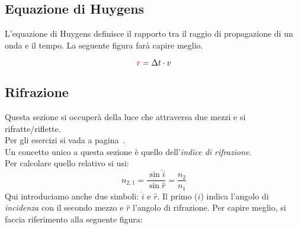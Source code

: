 \subsection{Equazione di Huygens}
L'equazione di Huygens definisce il rapporto tra il raggio di propagazione di un onda e il tempo.
La seguente figura farà capire meglio.

\begin{center}
\end{center}
\begin{equation*}
\mathcolor{red}{r} = \Delta t\cdot v
\end{equation*}

\subsection{Rifrazione}\label{subsec:onde:rifrazione}
Questa sezione si occuperà della luce che attraversa due mezzi e si rifratte/riflette.\\
Per gli esercizi si vada a pagina~\pageref{ex:rifrazione}.\\ [\baselineskip]
Un concetto unico a questa sezione è quello dell'\emph{indice di rifrazione}.\\
Per calcolare quello relativo si usi:
  \begin{equation*}
n_{2,1} = \frac{\sin\hat{i}}{\sin\hat{r}} = \frac{n_2}{n_1}
\end{equation*}
Qui introduciamo anche due simboli: $\hat{i}$ e $\hat{r}$. Il primo ($\hat{i}$) indica l'angolo di
\emph{incidenza} con il secondo mezzo e $\hat{r}$ l'angolo di rifrazione. Per capire meglio, si
faccia riferimento alla seguente figura:


